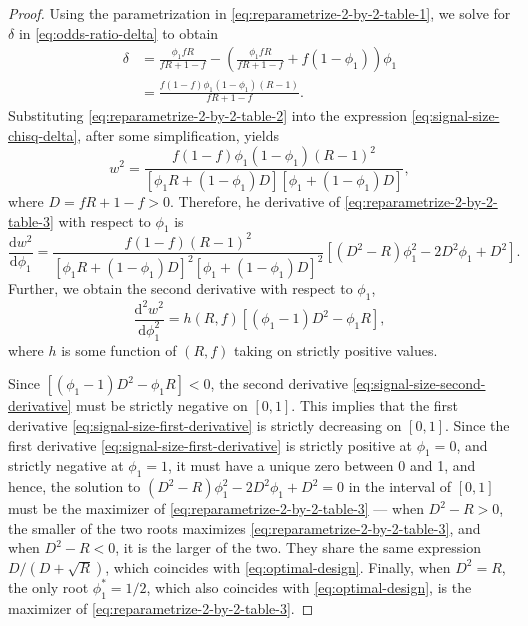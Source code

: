 \begin{proof}
	Using the parametrization in \eqref{eq:reparametrize-2-by-2-table-1}, we solve for $\delta$ in \eqref{eq:odds-ratio-delta} to obtain
	\begin{align}
		\delta &= \frac{\phi_1 fR}{fR+1-f} - \left(\frac{\phi_1 fR}{fR+1-f} + f(1-\phi_1)\right)\phi_1 \nonumber \\
		&= \frac{f(1-f)\phi_1(1-\phi_1)(R-1)}{fR+1-f}. \label{eq:reparametrize-2-by-2-table-2}
	\end{align}
	Substituting \eqref{eq:reparametrize-2-by-2-table-2} into the expression \eqref{eq:signal-size-chisq-delta}, after some simplification, yields
	\begin{equation} \label{eq:reparametrize-2-by-2-table-3}
	w^2 = \frac{f(1-f)\phi_1(1-\phi_1)(R-1)^2}{\left[\phi_1 R + (1-\phi_1)D\right]\left[\phi_1 + (1-\phi_1)D\right]},
	\end{equation}
	where $D = fR+1-f > 0$.
	Therefore, he derivative of \eqref{eq:reparametrize-2-by-2-table-3} with respect to $\phi_1$ is
	\begin{equation} \label{eq:signal-size-first-derivative}
	\frac{\mathrm{d}w^2}{\mathrm{d}\phi_1} = 
	\frac{f(1-f)(R-1)^2}{\left[\phi_1 R+(1-\phi_1)D\right]^2 \left[\phi_1+(1-\phi_1)D\right]^2} \left[(D^2-R)\phi_1^2 - 2D^2\phi_1 + D^2\right].
	\end{equation}
	Further, we obtain the second derivative with respect to $\phi_1$,
	\begin{equation} \label{eq:signal-size-second-derivative}
	\frac{\mathrm{d}^2w^2}{\mathrm{d}\phi_1^2} = 
	h(R,f) \left[(\phi_1-1)D^2 - \phi_1R\right],
	\end{equation}
	where $h$ is some function of $(R,f)$ taking on strictly positive values.
	
	Since $\left[(\phi_1-1)D^2 - \phi_1R\right]<0$, the second derivative \eqref{eq:signal-size-second-derivative} must be strictly negative on $[0,1]$.
	This implies that the first derivative \eqref{eq:signal-size-first-derivative} is strictly decreasing on $[0,1]$. 
	Since the first derivative \eqref{eq:signal-size-first-derivative} is strictly positive at $\phi_1=0$, and strictly negative at $\phi_1=1$, it must have a unique zero between 0 and 1, and hence, the solution to $(D^2-R)\phi_1^2 - 2D^2\phi_1 + D^2 = 0$ in the interval of $[0,1]$ must be the maximizer of \eqref{eq:reparametrize-2-by-2-table-3} --- when $D^2-R>0$, the smaller of the two roots maximizes \eqref{eq:reparametrize-2-by-2-table-3}, and when $D^2-R<0$, it is the larger of the two.
	They share the same expression ${D}/{(D+\sqrt{R})}$, which coincides with \eqref{eq:optimal-design}.
	Finally, when $D^2=R$, the only root $\phi_1^*=1/2$, which also coincides with \eqref{eq:optimal-design}, is the maximizer of \eqref{eq:reparametrize-2-by-2-table-3}.
\end{proof}

